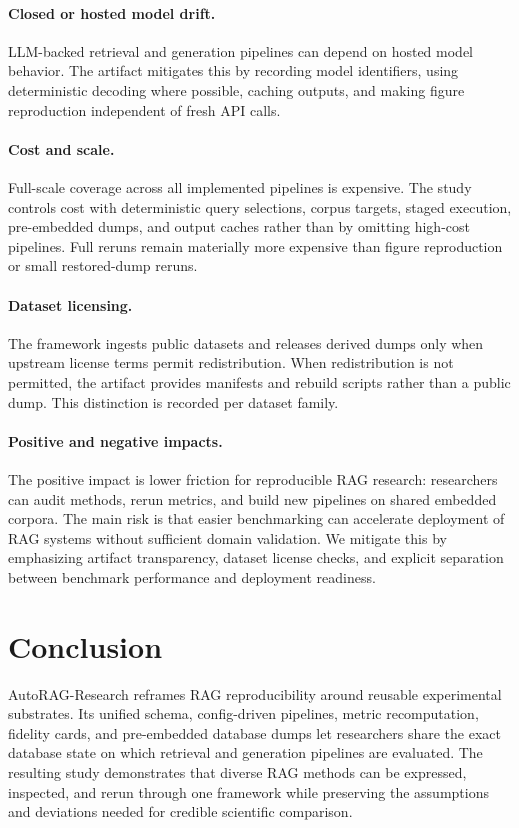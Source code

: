 \documentclass{article}
\newcommand{\framework}{AutoRAG-Research}
\begin{document}
\paragraph{Closed or hosted model drift.}
LLM-backed retrieval and generation pipelines can depend on hosted model behavior. The artifact mitigates this by recording model identifiers, using deterministic decoding where possible, caching outputs, and making figure reproduction independent of fresh API calls.

\paragraph{Cost and scale.}
Full-scale coverage across all implemented pipelines is expensive. The study controls cost with deterministic query selections, corpus targets, staged execution, pre-embedded dumps, and output caches rather than by omitting high-cost pipelines. Full reruns remain materially more expensive than figure reproduction or small restored-dump reruns.

\paragraph{Dataset licensing.}
The framework ingests public datasets and releases derived dumps only when upstream license terms permit redistribution. When redistribution is not permitted, the artifact provides manifests and rebuild scripts rather than a public dump. This distinction is recorded per dataset family.

\paragraph{Positive and negative impacts.}
The positive impact is lower friction for reproducible RAG research: researchers can audit methods, rerun metrics, and build new pipelines on shared embedded corpora. The main risk is that easier benchmarking can accelerate deployment of RAG systems without sufficient domain validation. We mitigate this by emphasizing artifact transparency, dataset license checks, and explicit separation between benchmark performance and deployment readiness.

\section{Conclusion}

\framework{} reframes RAG reproducibility around reusable experimental substrates. Its unified schema, config-driven pipelines, metric recomputation, fidelity cards, and pre-embedded database dumps let researchers share the exact database state on which retrieval and generation pipelines are evaluated. The resulting study demonstrates that diverse RAG methods can be expressed, inspected, and rerun through one framework while preserving the assumptions and deviations needed for credible scientific comparison.
\end{document}
